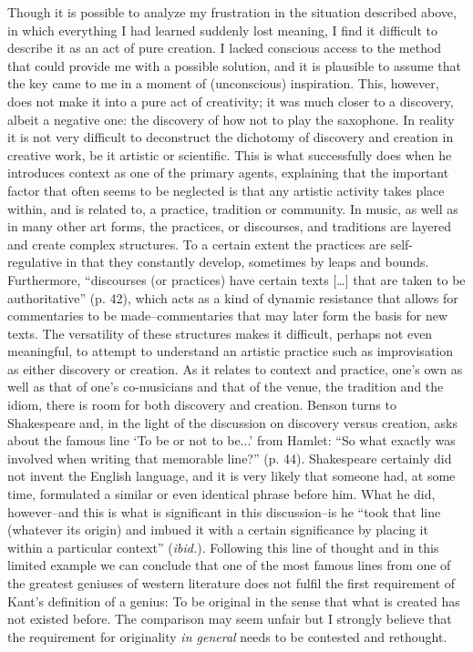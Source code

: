 \documentclass[a4paper]{article}
\begin{document}
Though it is possible to analyze my frustration in the situation described above, in which everything I had learned suddenly lost meaning, I find it difficult to describe it as an act of pure creation. I lacked conscious access to the method that could provide me with a possible solution, and it is plausible to assume that the key came to me in a moment of (unconscious) inspiration. This, however, does not make it into a pure act of creativity; it was much closer to a discovery, albeit a negative one: the discovery of how not to play the saxophone. In reality it is not very difficult to deconstruct the dichotomy of discovery and creation in creative work, be it artistic or scientific. This is what \citet{benson03} successfully does when he introduces context as one of the primary agents, explaining that the important factor that often seems to be neglected is that any artistic activity takes place within, and is related to, a practice, tradition or community. In music, as well as in many other art forms, the practices, or discourses, and traditions are layered and create complex structures. To a certain extent the practices are self-regulative in that they constantly develop, sometimes by leaps and bounds. Furthermore, ``discourses (or practices) have certain texts [\ldots] that are taken to be authoritative'' (p. 42), which acts as a kind of dynamic resistance that allows for commentaries to be made--commentaries that may later form the basis for new texts. The versatility of these structures makes it difficult, perhaps not even meaningful, to attempt to understand an artistic practice such as improvisation as either discovery or creation. As it relates to context and practice, one's own as well as that of one's co-musicians and that of the venue, the tradition and the idiom, there is room for both discovery and creation. Benson turns to Shakespeare and, in the light of the discussion on discovery versus creation, asks about the famous line `To be or not to be...' from Hamlet: ``So what exactly was involved when writing that memorable line?'' (p. 44). Shakespeare certainly did not invent the English language, and it is very likely that someone had, at some time, formulated a similar or even identical phrase before him. What he did, however--and this is what is significant in this discussion--is he ``took that line (whatever its origin) and imbued it with a certain significance by placing it within a particular context'' (\emph{ibid.}). Following this line of thought and in this limited example we can conclude that one of the most famous lines from one of the greatest geniuses of western literature does not fulfil the first requirement of Kant's definition of a genius: To be original in the sense that what is created has not existed before. The comparison may seem unfair but I strongly believe that the requirement for originality \emph{in general} needs to be contested and rethought. 
\end{document}
